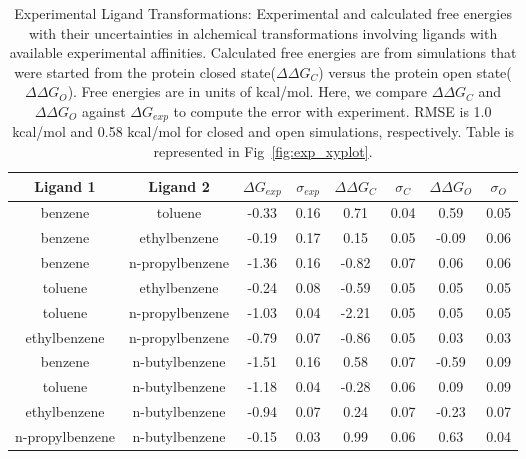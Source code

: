 \begin{table}[!htb]
\centering
\caption{Experimental Ligand Transformations:
Experimental and calculated free energies with their uncertainties in alchemical transformations involving ligands with available experimental affinities.
Calculated free energies are from simulations that were started from the protein closed state(\boldmath$\Delta\Delta G_{C}$) versus the protein open state(\boldmath$\Delta\Delta G_{O}$). 
 Free energies are in units of kcal/mol.
 Here, we compare \boldmath$\Delta\Delta G_{C}$ and \boldmath$\Delta\Delta G_{O}$ against \boldmath$\Delta G_{exp}$ to compute the error with experiment.
 RMSE is 1.0 kcal/mol and 0.58 kcal/mol for closed and open simulations, respectively.
 Table is represented in Fig~\ref{fig:exp_xyplot}.
}
\label{tbl:exp_set}
\begin{tabular}{|c|c|c|c|c|c|c|c|}
\hline
\textbf{Ligand 1} & \textbf{Ligand 2}  & \boldmath$\Delta G_{exp}$  & \boldmath$\sigma_{exp}$ & \boldmath$\Delta\Delta G_{C}$ & \boldmath$\sigma_{C}$ & \boldmath$\Delta\Delta G_{O}$ & \boldmath$\sigma_{O}$ \\ \hline
benzene         & toluene         & -0.33        & 0.16            & 0.71       & 0.04          & 0.59       & 0.05          \\ \hline
benzene         & ethylbenzene    & -0.19        & 0.17            & 0.15       & 0.05          & -0.09      & 0.06          \\ \hline
benzene         & n-propylbenzene & -1.36        & 0.16            & -0.82      & 0.07          & 0.06       & 0.06          \\ \hline
toluene         & ethylbenzene    & -0.24        & 0.08            & -0.59      & 0.05          & 0.05       & 0.05          \\ \hline
toluene         & n-propylbenzene & -1.03        & 0.04            & -2.21      & 0.05          & 0.05       & 0.05          \\ \hline
ethylbenzene    & n-propylbenzene & -0.79        & 0.07            & -0.86      & 0.05          & 0.03       & 0.03          \\ \hline
benzene         & n-butylbenzene  & -1.51        & 0.16            & 0.58       & 0.07          & -0.59      & 0.09          \\ \hline
toluene         & n-butylbenzene  & -1.18        & 0.04            & -0.28      & 0.06          & 0.09       & 0.09          \\ \hline
ethylbenzene    & n-butylbenzene  & -0.94        & 0.07            & 0.24       & 0.07          & -0.23      & 0.07          \\ \hline
n-propylbenzene & n-butylbenzene  & -0.15        & 0.03            & 0.99       & 0.06          & 0.63       & 0.04          \\ \hline
\end{tabular}
\end{table}

